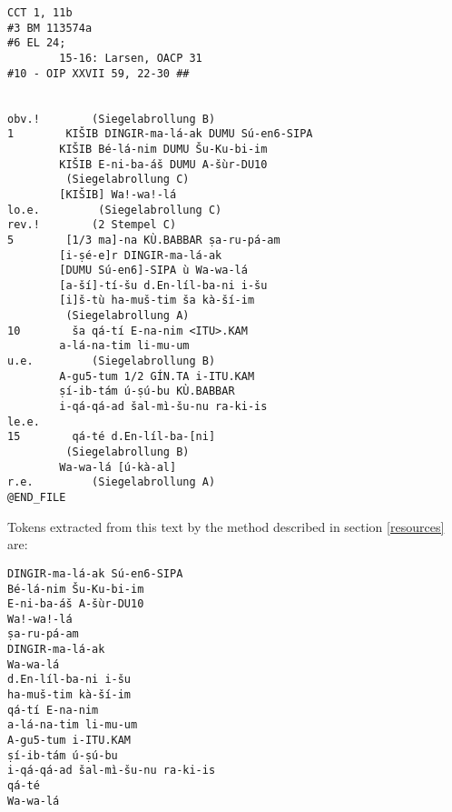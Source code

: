 \documentclass[11pt,letterpaper]{article}
\begin{document}
\begin{verbatim}
CCT 1, 11b
#3 BM 113574a
#6 EL 24;
        15-16: Larsen, OACP 31
#10 - OIP XXVII 59, 22-30 ##


obv.!        (Siegelabrollung B)
1        KIŠIB DINGIR-ma-lá-ak DUMU Sú-en6-SIPA
        KIŠIB Bé-lá-nim DUMU Šu-Ku-bi-im
        KIŠIB E-ni-ba-áš DUMU A-šùr-DU10
         (Siegelabrollung C)
        [KIŠIB] Wa!-wa!-lá
lo.e.         (Siegelabrollung C)
rev.!        (2 Stempel C)
5        [1/3 ma]-na KÙ.BABBAR ṣa-ru-pá-am
        [i-ṣé-e]r DINGIR-ma-lá-ak
        [DUMU Sú-en6]-SIPA ù Wa-wa-lá
        [a-ší]-tí-šu d.En-líl-ba-ni i-šu
        [i]š-tù ha-muš-tim ša kà-ší-im
         (Siegelabrollung A)
10        ša qá-tí E-na-nim <ITU>.KAM
        a-lá-na-tim li-mu-um
u.e.         (Siegelabrollung B)
        A-gu5-tum 1/2 GÍN.TA i-ITU.KAM
        ṣí-ib-tám ú-ṣú-bu KÙ.BABBAR
        i-qá-qá-ad šal-mì-šu-nu ra-ki-is
le.e.
15        qá-té d.En-líl-ba-[ni]
         (Siegelabrollung B)
        Wa-wa-lá [ú-kà-al]
r.e.         (Siegelabrollung A)
@END_FILE

\end{verbatim}

Tokens extracted from this text by the method described in section \ref{resources} are:

\begin{verbatim}
DINGIR-ma-lá-ak Sú-en6-SIPA
Bé-lá-nim Šu-Ku-bi-im
E-ni-ba-áš A-šùr-DU10
Wa!-wa!-lá
ṣa-ru-pá-am
DINGIR-ma-lá-ak
Wa-wa-lá
d.En-líl-ba-ni i-šu
ha-muš-tim kà-ší-im
qá-tí E-na-nim
a-lá-na-tim li-mu-um
A-gu5-tum i-ITU.KAM
ṣí-ib-tám ú-ṣú-bu
i-qá-qá-ad šal-mì-šu-nu ra-ki-is
qá-té
Wa-wa-lá
\end{verbatim}

\nocite{*}




\label{lastpage}
\end{document}
